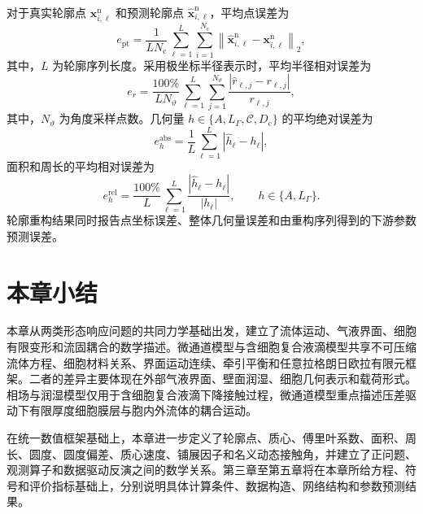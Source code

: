 对于真实轮廓点 $\boldsymbol{x}_{i,\ell}^{\mathrm n}$ 和预测轮廓点 $\widehat{\boldsymbol{x}}_{i,\ell}^{\mathrm n}$，平均点误差为
\begin{equation}
e_{\mathrm{pt}}
=
\frac{1}{LN_{\mathrm c}}
\sum_{\ell=1}^{L}
\sum_{i=1}^{N_{\mathrm c}}
\left\|
\widehat{\boldsymbol{x}}_{i,\ell}^{\mathrm n}
-
\boldsymbol{x}_{i,\ell}^{\mathrm n}
\right\|_2,
\label{eq:ch2_point_error}
\end{equation}
其中，$L$ 为轮廓序列长度。采用极坐标半径表示时，平均半径相对误差为
\begin{equation}
e_r
=
\frac{100\%}{LN_{\vartheta}}
\sum_{\ell=1}^{L}
\sum_{j=1}^{N_{\vartheta}}
\frac{
|\widehat r_{\ell,j}-r_{\ell,j}|}
{r_{\ell,j}},
\label{eq:ch2_radius_relative_error}
\end{equation}
其中，$N_{\vartheta}$ 为角度采样点数。几何量 $h\in\{A,L_{\Gamma},\mathcal{C},D_{\mathrm c}\}$ 的平均绝对误差为
\begin{equation}
e_h^{\mathrm{abs}}
=
\frac{1}{L}
\sum_{\ell=1}^{L}
\left|\widehat h_{\ell}-h_{\ell}\right|,
\label{eq:ch2_geometry_absolute_error}
\end{equation}
面积和周长的平均相对误差为
\begin{equation}
e_h^{\mathrm{rel}}
=
\frac{100\%}{L}
\sum_{\ell=1}^{L}
\frac{|\widehat h_{\ell}-h_{\ell}|}{|h_{\ell}|},
\qquad
h\in\{A,L_{\Gamma}\}.
\label{eq:ch2_geometry_relative_error}
\end{equation}
轮廓重构结果同时报告点坐标误差、整体几何量误差和由重构序列得到的下游参数预测误差。

\section{本章小结}

本章从两类形态响应问题的共同力学基础出发，建立了流体运动、气液界面、细胞有限变形和流固耦合的数学描述。微通道模型与含细胞复合液滴模型共享不可压缩流体方程、细胞材料关系、界面运动连续、牵引平衡和任意拉格朗日欧拉有限元框架。二者的差异主要体现在外部气液界面、壁面润湿、细胞几何表示和载荷形式。相场与润湿模型仅用于含细胞复合液滴下降接触过程，微通道模型重点描述压差驱动下有限厚度细胞膜层与胞内外流体的耦合运动。

在统一数值框架基础上，本章进一步定义了轮廓点、质心、傅里叶系数、面积、周长、圆度、圆度偏差、质心速度、铺展因子和名义动态接触角，并建立了正问题、观测算子和数据驱动反演之间的数学关系。第三章至第五章将在本章所给方程、符号和评价指标基础上，分别说明具体计算条件、数据构造、网络结构和参数预测结果。
